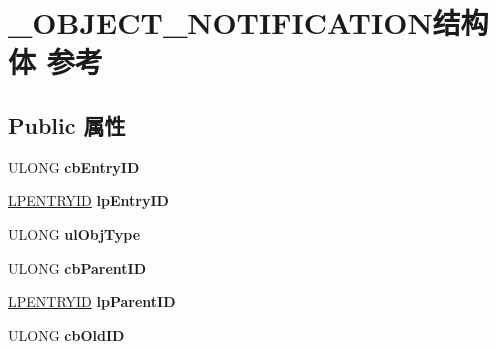 \hypertarget{struct___o_b_j_e_c_t___n_o_t_i_f_i_c_a_t_i_o_n}{}\section{\+\_\+\+O\+B\+J\+E\+C\+T\+\_\+\+N\+O\+T\+I\+F\+I\+C\+A\+T\+I\+O\+N结构体 参考}
\label{struct___o_b_j_e_c_t___n_o_t_i_f_i_c_a_t_i_o_n}
\subsection*{Public 属性}
\begin{DoxyCompactItemize}
\item 
\mbox{\label{struct___o_b_j_e_c_t___n_o_t_i_f_i_c_a_t_i_o_n_aa64e16baa597625cc2aee0a4fe2b9480}} 
U\+L\+O\+NG {\bfseries cb\+Entry\+ID}
\item 
\mbox{\label{struct___o_b_j_e_c_t___n_o_t_i_f_i_c_a_t_i_o_n_a7dab1f3e40bc4ee74a72a4fb767e34bd}} 
\hyperlink{struct___e_n_t_r_y_i_d}{L\+P\+E\+N\+T\+R\+Y\+ID} {\bfseries lp\+Entry\+ID}
\item 
\mbox{\label{struct___o_b_j_e_c_t___n_o_t_i_f_i_c_a_t_i_o_n_a40404dfcb47040bc034473d430702f3b}} 
U\+L\+O\+NG {\bfseries ul\+Obj\+Type}
\item 
\mbox{\label{struct___o_b_j_e_c_t___n_o_t_i_f_i_c_a_t_i_o_n_a131320fc53e3c8054a39e9b045758795}} 
U\+L\+O\+NG {\bfseries cb\+Parent\+ID}
\item 
\mbox{\label{struct___o_b_j_e_c_t___n_o_t_i_f_i_c_a_t_i_o_n_a2e967d5e7004051f48d654f9f8dc408b}} 
\hyperlink{struct___e_n_t_r_y_i_d}{L\+P\+E\+N\+T\+R\+Y\+ID} {\bfseries lp\+Parent\+ID}
\item 
\mbox{\label{struct___o_b_j_e_c_t___n_o_t_i_f_i_c_a_t_i_o_n_ade7cf4903946051b09b03da1a33d073f}} 
U\+L\+O\+NG {\bfseries cb\+Old\+ID}
\item 
\mbox{\label{struct___o_b_j_e_c_t___n_o_t_i_f_i_c_a_t_i_o_n_a0ed4c6faa0f36a2e714c0c6aec97b603}} 

\end{DoxyCompactItemize}

